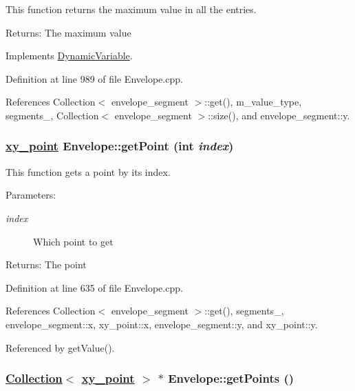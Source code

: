 This function returns the maximum value in all the entries. \begin{Desc}
\item[Returns:]The maximum value \end{Desc}


Implements \hyperlink{classDynamicVariable_a5}{Dynamic\-Variable}.

Definition at line 989 of file Envelope.cpp.

References Collection$<$ envelope\_\-segment $>$::get(), m\_\-value\_\-type, segments\_\-, Collection$<$ envelope\_\-segment $>$::size(), and envelope\_\-segment::y.\hypertarget{classEnvelope_a17}{
\subsubsection[getPoint]{\setlength{\rightskip}{0pt plus 5cm}\hyperlink{structxy__point}{xy\_\-point} Envelope::get\-Point (int {\em index})}}
\label{classEnvelope_a17}


This function gets a point by its index. \begin{Desc}
\item[Parameters:]
\begin{description}
\item[{\em index}]Which point to get \end{description}
\end{Desc}
\begin{Desc}
\item[Returns:]The point \end{Desc}


Definition at line 635 of file Envelope.cpp.

References Collection$<$ envelope\_\-segment $>$::get(), segments\_\-, envelope\_\-segment::x, xy\_\-point::x, envelope\_\-segment::y, and xy\_\-point::y.

Referenced by get\-Value().\hypertarget{classEnvelope_a12}{
\subsubsection[getPoints]{\setlength{\rightskip}{0pt plus 5cm}\hyperlink{classCollection}{Collection}$<$ \hyperlink{structxy__point}{xy\_\-point} $>$ $\ast$ Envelope::get\-Points ()}}
\label{classEnvelope_a12}


